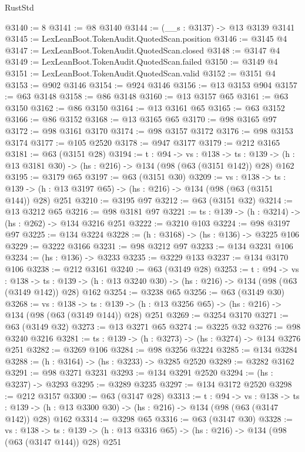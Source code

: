 \begin{lexlean}{RustStd}
\begin{coremodule}
{\begin{coremodule}
{{{{{{{{{@3140 := 8
@3141 := @8 @3140
@3144 := (__s : @3137) -> @13 @3139 @3141
@3145 := LexLeanBoot.TokenAudit.QuotedScan.position
@3146 := @3145 @4
@3147 := LexLeanBoot.TokenAudit.QuotedScan.closed
@3148 := @3147 @4
@3149 := LexLeanBoot.TokenAudit.QuotedScan.failed
@3150 := @3149 @4
@3151 := LexLeanBoot.TokenAudit.QuotedScan.valid
@3152 := @3151 @4
@3153 := @902 @3146
@3154 := @924 @3146
@3156 := @13 @3153 @904
@3157 := @63 @3148
@3158 := @86 @3148
@3160 := @13 @3157 @65
@3161 := @63 @3150
@3162 := @86 @3150
@3164 := @13 @3161 @65
@3165 := @63 @3152
@3166 := @86 @3152
@3168 := @13 @3165 @65
@3170 := @98 @3165 @97
@3172 := @98 @3161 @3170
@3174 := @98 @3157 @3172
@3176 := @98 @3153 @3174
@3177 := @105 @2520
@3178 := @947 @3177
@3179 := @212 @3165
@3181 := @63 (@3151 @28)
@3194 := {t : @94} ->
  {vs : @138} ->
  {ts : @139} -> (h : @13 @3181 @30) -> (hs : @216) -> @134 (@98 (@63 (@3151 @142)) @28) @162
@3195 := @3179 @65
@3197 := @63 (@3151 @30)
@3209 := {vs : @138} ->
  {ts : @139} -> (h : @13 @3197 @65) -> (hs : @216) -> @134 (@98 (@63 (@3151 @144)) @28) @251
@3210 := @3195 @97
@3212 := @63 (@3151 @32)
@3214 := @13 @3212 @65
@3216 := @98 @3181 @97
@3221 := {ts : @139} -> (h : @3214) -> (hs : @262) -> @134 @3216 @251
@3222 := @3210 @103
@3224 := @98 @3197 @97
@3225 := @134 @3224
@3228 := (h : @3168) -> (hs : @136) -> @3225 @106
@3229 := @3222 @3166
@3231 := @98 @3212 @97
@3233 := @134 @3231 @106
@3234 := (hs : @136) -> @3233
@3235 := @3229 @133
@3237 := @134 @3170 @106
@3238 := @212 @3161
@3240 := @63 (@3149 @28)
@3253 := {t : @94} ->
  {vs : @138} ->
  {ts : @139} -> (h : @13 @3240 @30) -> (hs : @216) -> @134 (@98 (@63 (@3149 @142)) @28) @162
@3254 := @3238 @65
@3256 := @63 (@3149 @30)
@3268 := {vs : @138} ->
  {ts : @139} -> (h : @13 @3256 @65) -> (hs : @216) -> @134 (@98 (@63 (@3149 @144)) @28) @251
@3269 := @3254 @3170
@3271 := @63 (@3149 @32)
@3273 := @13 @3271 @65
@3274 := @3225 @32
@3276 := @98 @3240 @3216
@3281 := {ts : @139} -> (h : @3273) -> (hs : @3274) -> @134 @3276 @251
@3282 := @3269 @106
@3284 := @98 @3256 @3224
@3285 := @134 @3284
@3288 := (h : @3164) -> (hs : @3233) -> @3285 @2520
@3289 := @3282 @3162
@3291 := @98 @3271 @3231
@3293 := @134 @3291 @2520
@3294 := (hs : @3237) -> @3293
@3295 := @3289 @3235
@3297 := @134 @3172 @2520
@3298 := @212 @3157
@3300 := @63 (@3147 @28)
@3313 := {t : @94} ->
  {vs : @138} ->
  {ts : @139} -> (h : @13 @3300 @30) -> (hs : @216) -> @134 (@98 (@63 (@3147 @142)) @28) @162
@3314 := @3298 @65
@3316 := @63 (@3147 @30)
@3328 := {vs : @138} ->
  {ts : @139} -> (h : @13 @3316 @65) -> (hs : @216) -> @134 (@98 (@63 (@3147 @144)) @28) @251
}}}}}}}}}
\end{coremodule}}
\end{coremodule}
\end{lexlean}
